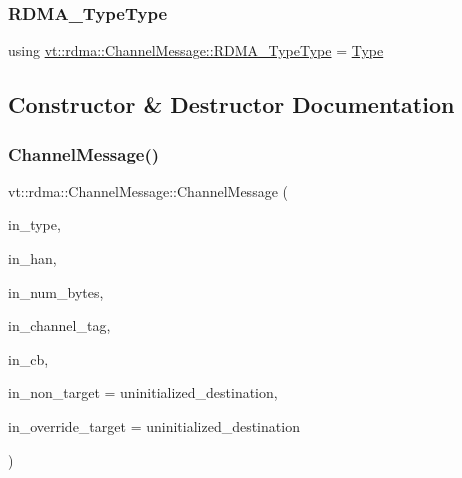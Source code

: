\subsubsection{\texorpdfstring{R\+D\+M\+A\+\_\+\+Type\+Type}{RDMA\_TypeType}}
{\footnotesize\ttfamily using \hyperlink{namespacevt_1_1rdma_ac848e1d9da43db6294bd06f83e5d3946}{vt\+::rdma\+::\+Channel\+Message\+::\+R\+D\+M\+A\+\_\+\+Type\+Type} =  \hyperlink{namespacevt_1_1rdma_ac848e1d9da43db6294bd06f83e5d3946}{Type}}



\subsection{Constructor \& Destructor Documentation}
\mbox{\label{structvt_1_1rdma_1_1_channel_message_ad6ee8a328480b24231dd247397774d49}} 
\subsubsection{\texorpdfstring{Channel\+Message()}{ChannelMessage()}}
{\footnotesize\ttfamily vt\+::rdma\+::\+Channel\+Message\+::\+Channel\+Message (\begin{DoxyParamCaption}\item[{\hyperlink{namespacevt_1_1rdma_ac848e1d9da43db6294bd06f83e5d3946}{R\+D\+M\+A\+\_\+\+Type\+Type} const \&}]{in\+\_\+type,  }\item[{\hyperlink{namespacevt_a10442579ec4e7ebef223818e64bcf908}{R\+D\+M\+A\+\_\+\+Handle\+Type} const \&}]{in\+\_\+han,  }\item[{\hyperlink{namespacevt_aab8d55968084610ce3b17057981e9300}{Byte\+Type} const \&}]{in\+\_\+num\+\_\+bytes,  }\item[{\hyperlink{namespacevt_a84ab281dae04a52a4b243d6bf62d0e52}{Tag\+Type} const \&}]{in\+\_\+channel\+\_\+tag,  }\item[{\hyperlink{namespacevt_a57b238783d05de96bc2c4027f7073b7f}{Callback}$<$$>$}]{in\+\_\+cb,  }\item[{\hyperlink{namespacevt_a866da9d0efc19c0a1ce79e9e492f47e2}{Node\+Type} const \&}]{in\+\_\+non\+\_\+target = {\ttfamily uninitialized\+\_\+destination},  }\item[{\hyperlink{namespacevt_a866da9d0efc19c0a1ce79e9e492f47e2}{Node\+Type} const \&}]{in\+\_\+override\+\_\+target = {\ttfamily uninitialized\+\_\+destination} }\end{DoxyParamCaption})\hspace{0.3cm}{\ttfamily [inline]}}



